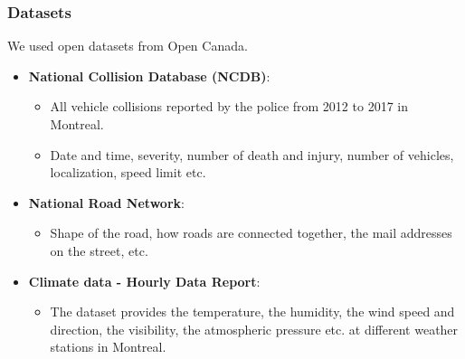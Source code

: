 \documentclass[slidestop,compress,red,mathserif]{beamer}
\begin{document}

\begin{frame}
\frametitle{Datasets}

\begin{footnotesize}
We used open datasets from Open Canada.

\begin{itemize}
\item[] \textbf{National Collision Database (NCDB)}:
  \begin{itemize}
  	\item All vehicle collisions reported by the police from 2012 to 2017 in Montreal.
  	\item Date and time, severity, number of death and injury, number of vehicles, localization, speed limit etc.
  \end{itemize}
\item[] \textbf{National Road Network}:
  \begin{itemize}
    \item Shape of the road, how roads are
connected together, the mail addresses on the street, etc.
  \end{itemize}
\item[] \textbf{Climate data - Hourly Data Report}:
  \begin{itemize}
    \item The dataset provides the temperature, the humidity, the wind speed and direction, the visibility, the atmospheric pressure etc. at different weather stations in Montreal.
  \end{itemize}
\end{itemize}

\end{footnotesize}

\end{frame}

\end{document}
